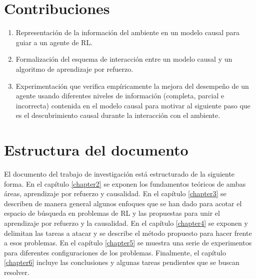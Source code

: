 \section{Contribuciones}


\begin{enumerate}
    \item Representación de la información del ambiente
    en un modelo causal para guiar a un agente de RL.
    \item 
    Formalización del esquema 
    de interacción entre
    un modelo causal y un algoritmo de aprendizaje por
    refuerzo.
    \item Experimentación que verifica empíricamente
    la mejora del desempeño de un agente usando diferentes niveles de información (completa, parcial e incorrecta) contenida en el modelo causal para motivar al siguiente paso 
    que es el descubrimiento causal durante la interacción con el
    ambiente.
\end{enumerate}


\section{Estructura del documento}

El documento del trabajo de investigación está estructurado de la 
siguiente forma.
En el capítulo \ref{chapter2} se exponen los fundamentos teóricos de ambas áreas, aprendizaje por refuerzo y causalidad.
En el capítulo \ref{chapter3} se describen de manera general algunos enfoques
que se han dado para acotar el espacio de búsqueda en problemas
de RL y las propuestas para unir el aprendizaje por refuerzo y
la causalidad. En el capítulo \ref{chapter4} se exponen y
delimitan las tareas a atacar y se describe el método propuesto para hacer frente a esos problemas. En el capítulo \ref{chapter5} se muestra una serie de experimentos
para diferentes configuraciones de los problemas. Finalmente,
el capítulo \ref{chapter6} incluye las conclusiones y algunas tareas pendientes que se buscan resolver.

